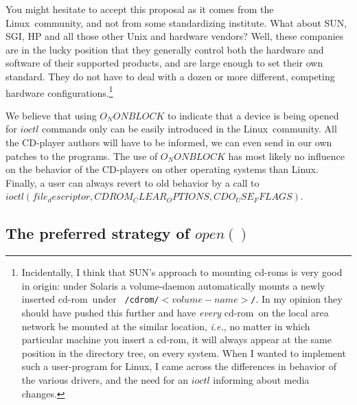 \documentclass{article}
\def\linux{{\sc Linux}}
\def\cdrom{{\sc cd-rom}}
\def\fo{\sl}                    %
\def\ie{{\fo i.e.}}
\begin{document}
You might hesitate to accept this proposal as it comes from the
\linux\ community, and not from some standardizing institute. What
about SUN, SGI, HP and all those other Unix and hardware vendors?
Well, these companies are in the lucky position that they generally
control both the hardware and software of their supported products,
and are large enough to set their own standard. They do not have to
deal with a dozen or more different, competing hardware
configurations.\footnote{Incidentally, I think that SUN's approach to
mounting \cdrom s is very good in origin: under Solaris a
volume-daemon automatically mounts a newly inserted \cdrom\ under {\tt
{/cdrom/$<volume-name>$/}}. In my opinion they should have pushed this
further and have {\em every\/} \cdrom\ on the local area network be
mounted at the similar location, \ie, no matter in which particular
machine you insert a \cdrom, it will always appear at the same
position in the directory tree, on every system. When I wanted to
implement such a user-program for \linux, I came across the
differences in behavior of the various drivers, and the need for an
$ioctl$ informing about media changes.}

We believe that using $O_NONBLOCK$ to indicate that a device is being opened
for $ioctl$ commands only can be easily introduced in the \linux\
community. All the CD-player authors will have to be informed, we can
even send in our own patches to the programs. The use of $O_NONBLOCK$
has most likely no influence on the behavior of the CD-players on
other operating systems than \linux. Finally, a user can always revert
to old behavior by a call to $ioctl(file_descriptor, CDROM_CLEAR_OPTIONS,
CDO_USE_FFLAGS)$. 

\subsection{The preferred strategy of $open()$}
\end{document}
